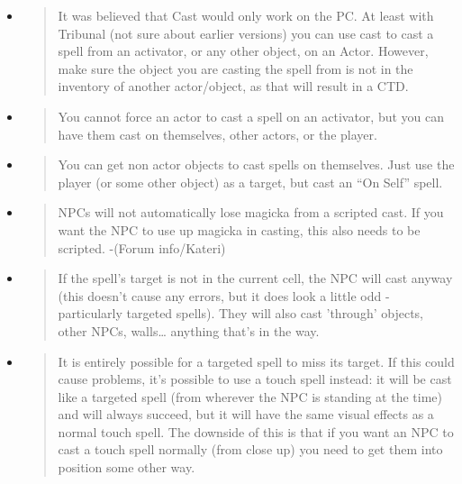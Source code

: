 \documentclass[
]{article}
\begin{document}
\begin{itemize}
\item
  \begin{quote}
  It was believed that Cast would only work on the PC. At least with
  Tribunal (not sure about earlier versions) you can use cast to cast a
  spell from an activator, or any other object, on an Actor. However,
  make sure the object you are casting the spell from is not in the
  inventory of another actor/object, as that will result in a CTD.
  \end{quote}
\item
  \begin{quote}
  You cannot force an actor to cast a spell on an activator, but you can
  have them cast on themselves, other actors, or the player.
  \end{quote}
\item
  \begin{quote}
  You can get non actor objects to cast spells on themselves. Just use
  the player (or some other object) as a target, but cast an ``On Self''
  spell.
  \end{quote}
\item
  \begin{quote}
  NPCs will not automatically lose magicka from a scripted cast. If you
  want the NPC to use up magicka in casting, this also needs to be
  scripted. -(Forum info/Kateri)
  \end{quote}
\item
  \begin{quote}
  If the spell's target is not in the current cell, the NPC will cast
  anyway (this doesn't cause any errors, but it does look a little odd -
  particularly targeted spells). They will also cast 'through' objects,
  other NPCs, walls\ldots{} anything that's in the way.
  \end{quote}
\item
  \begin{quote}
  It is entirely possible for a targeted spell to miss its target. If
  this could cause problems, it's possible to use a touch spell instead:
  it will be cast like a targeted spell (from wherever the NPC is
  standing at the time) and will always succeed, but it will have the
  same visual effects as a normal touch spell. The downside of this is
  that if you want an NPC to cast a touch spell normally (from close up)
  you need to get them into position some other way.
  \end{quote}
\end{itemize}
\end{document}
